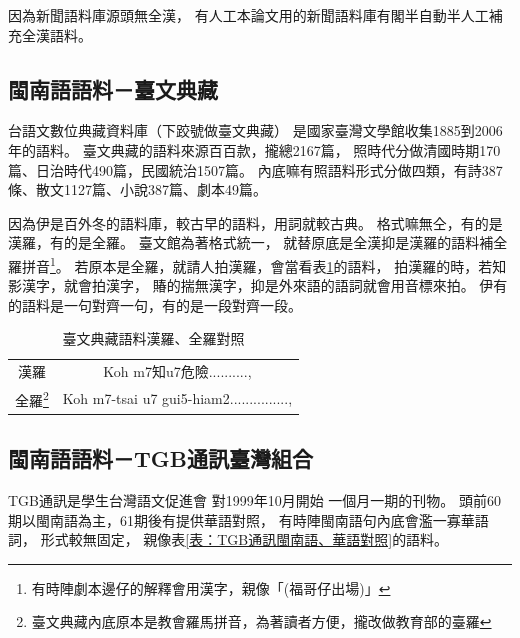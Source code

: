 因為新聞語料庫源頭無全漢，
有人工本論文用的新聞語料庫有閣半自動半人工補充全漢語料。


\subsection{閩南語語料－臺文典藏}
\label{節：臺文典藏}
台語文數位典藏資料庫（下跤號做臺文典藏）\cite{台語文數位典藏資料庫}
是國家臺灣文學館收集1885到2006年的語料。
臺文典藏的語料來源百百款，攏總2167篇，
照時代分做清國時期170篇、日治時代490篇，民國統治1507篇。
內底嘛有照語料形式分做四類，有詩387條、散文1127篇、小說387篇、劇本49篇。%

因為伊是百外冬的語料庫，較古早的語料，用詞就較古典。
格式嘛無仝，有的是漢羅，有的是全羅。
臺文館為著格式統一，
就替原底是全漢抑是漢羅的語料補全羅拼音\footnote{有時陣劇本邊仔的解釋會用漢字，親像「(福哥仔出場)」}。
若原本是全羅，就請人拍漢羅，會當看表\ref{表：臺文典藏語料}的語料，
拍漢羅的時，若知影漢字，就會拍漢字，
賰的揣無漢字，抑是外來語的語詞就會用音標來拍。
伊有的語料是一句對齊一句，有的是一段對齊一段。

\begin{table}
\caption{臺文典藏語料漢羅、全羅對照}
\label{表：臺文典藏語料}
\centering
\begin{tabular}{c|c}
漢羅 & Koh m7知u7危險.........., \\
全羅\footnote{臺文典藏內底原本是教會羅馬拼音，為著讀者方便，攏改做教育部的臺羅} & Koh m7-tsai u7 gui5-hiam2...............,\\
\end{tabular}
\end{table}


\subsection{閩南語語料－TGB通訊臺灣組合}
\label{節：TGB通訊－臺灣組合}
TGB通訊\cite{TGB通訊}是學生台灣語文促進會
對1999年10月開始\cite{學生台灣語文促進會對1999年10月開始}
一個月一期的刊物。
頭前60期以閩南語為主，61期後有提供華語對照，
有時陣閩南語句內底會濫一寡華語詞，
形式較無固定，
親像表\ref{表：TGB通訊閩南語、華語對照}的語料。


